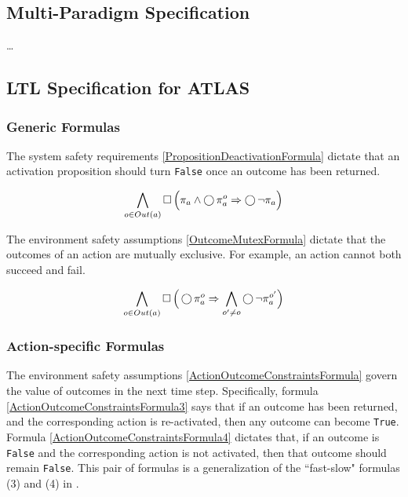 
\subsection{Multi-Paradigm Specification}

\ldots

\subsection{LTL Specification for ATLAS}

\subsubsection{Generic Formulas}

The system safety requirements \eqref{PropositionDeactivationFormula} dictate that an activation proposition should turn \texttt{False} once an outcome has been returned.

\begin{equation}\label{PropositionDeactivationFormula}
	\bigwedge \limits_{o \in Out(a)} \operatorname{\Box} \Big( \pi_a \wedge \operatorname{\bigcirc} \pi_a^o \Rightarrow \operatorname{\bigcirc} \lnot \pi_a \Big)
\end{equation}

The environment safety assumptions \eqref{OutcomeMutexFormula} dictate that the outcomes of an action are mutually exclusive. 
For example, an action cannot both succeed and fail.

\begin{equation}\label{OutcomeMutexFormula}
	\bigwedge \limits_{o \in Out(a)} \operatorname{\Box} \Big( \operatorname{\bigcirc} \pi_a^o \Rightarrow \bigwedge \limits_{o^\prime \neq o} \operatorname{\bigcirc} \lnot \pi_a^{o^\prime} \Big)
\end{equation}


\subsubsection{Action-specific Formulas}

The environment safety assumptions \eqref{ActionOutcomeConstraintsFormula} govern the value of outcomes in the next time step. 
Specifically, formula \eqref{ActionOutcomeConstraintsFormula3} says that if an outcome has been returned, and the corresponding action is re-activated, then any outcome can become \texttt{True}. 
Formula \eqref{ActionOutcomeConstraintsFormula4} dictates that, if an outcome is \texttt{False} and the corresponding action is not activated, then that outcome should remain \texttt{False}.
This pair of formulas is a generalization of the ``fast-slow" formulas (3) and (4) in \cite{Vasu2013ICRA}.

